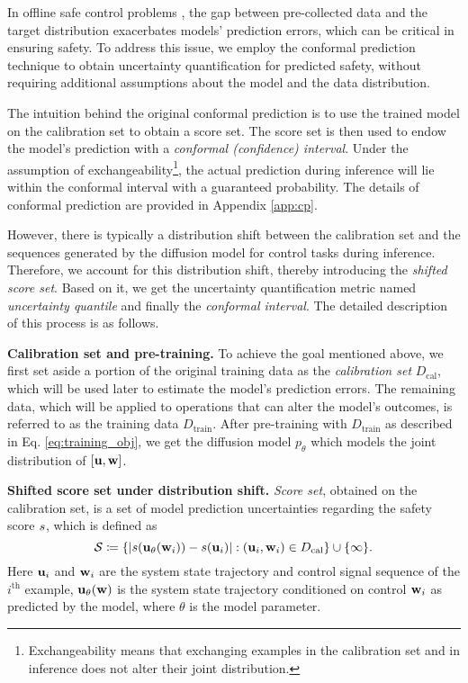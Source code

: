 In offline safe control problems \cite{xu2022constraints, gu2022review}, the gap between pre-collected data and the target distribution exacerbates models' prediction errors, which can be critical in ensuring safety. To address this issue, we employ the conformal prediction technique to obtain uncertainty quantification for predicted safety, without requiring additional assumptions about the model and the data distribution.

The intuition behind the original conformal prediction \cite{vovk2005algorithmic} is to use the trained model on the calibration set to obtain a score set. The score set is then used to endow the model's prediction with a \emph{conformal (confidence) interval}. Under the assumption of exchangeability\footnote{Exchangeability means that exchanging examples in the calibration set and in inference does not alter their joint distribution.}, the actual prediction during inference will lie within the conformal interval with a guaranteed probability. The details of conformal prediction are provided in Appendix \ref{app:cp}. 

However, there is typically a distribution shift between the calibration set and the sequences generated by the diffusion model for control tasks during inference. Therefore, we account for this distribution shift, thereby introducing the \textit{shifted score set}. Based on it, we get the uncertainty quantification metric named \textit{uncertainty quantile} and finally the \textit{conformal interval}. The detailed description of this process is as follows.


\textbf{Calibration set and pre-training.} To achieve the goal mentioned above, we first set aside a portion of the original training data as the \textit{calibration set} \( D_{\text{cal}} \), which will be used later to estimate the model's prediction errors. The remaining data, which will be applied to operations that can alter the model’s outcomes, is referred to as the training data \( D_{\text{train}} \). After pre-training with \( D_{\text{train}} \) as described in Eq. \ref{eq:training_obj}, we get the diffusion model $p_\theta$ which models the joint distribution of $[\mathbf{u},\mathbf{w}]$. 

\textbf{Shifted score set under distribution shift.} \textit{Score set}, obtained on the calibration set, is a set of model prediction uncertainties regarding the safety score $s$, which is defined as 
\begin{equation}
    \mathcal{S}\coloneqq\{|s(\mathbf{u}_\theta(\mathbf{w}_i)) - s(\mathbf{u}_i)|: (\mathbf{u}_i, \mathbf{w}_i)\in D_{\text{cal}}\}\cup\{\infty\}.
    \label{eq:scoreset}
\end{equation}
Here $\mathbf{u}_i$ and $\mathbf{w}_i$ are the system state trajectory and control signal sequence of the $i^\text{th}$ example, $\mathbf{u}_\theta(\mathbf{w})$ is the system state trajectory conditioned on control $\mathbf{w}_i$ as predicted by the model, where $\theta$ is the model parameter.

